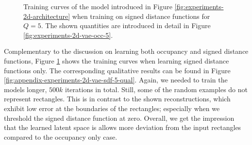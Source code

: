 \begin{figure}
\begin{subfigure}[t]{0.48\textwidth}
  \end{subfigure}
  \caption{Training curves of the model introduced in Figure
  \ref{fig:experiments-2d-architecture} when training on signed distance functions
  for $Q = 5$. The shown quantities are introduced in detail in Figure
  \ref{fig:experiments-2d-vae-occ-5}.}
  \label{fig:appendix-experiments-vae-sdf-5}
\end{figure}

Complementary to the discussion on learning both occupancy and signed distance
functions, Figure \ref{fig:appendix-experiments-vae-sdf-5} shows the training curves
when learning signed distance functions only. The corresponding qualitative results
can be found in Figure \ref{fig:appendix-experiments-2d-vae-sdf-5-qual}. Again,
we needed to train the models longer, $500k$ iterations in total. Still,
some of the random examples do not represent rectangles. This is in contrast
to the shown reconstructions, which exhibit low error at the boundaries of
the rectangles; especially when we threshold the signed distance function at
zero. Overall, we get the impression that the learned latent space is allows
more deviation from the input rectangles compared to the occupancy only case.

